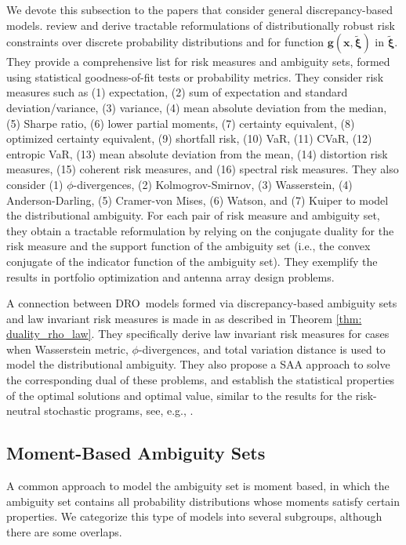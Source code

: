 \documentclass[final,onefignum,onetabnum]{class}
\newcommand{\bs}[1]{\boldsymbol{#1}} %
\newcommand{\txi}{\tilde{\bs{\xi}}}
\newcommand{\dro}{DRO}
\begin{document}
We devote  this subsection to the papers that consider general discrepancy-based models. 
\citet{postek2016} review and derive tractable reformulations of distributionally robust risk constraints over  discrete probability
distributions and for function $\bs{g}(\bs{x},\txi)$ in $\txi$. They provide a comprehensive list  for  risk measures and ambiguity sets, formed  using statistical
goodness-of-fit tests or probability metrics. 
They consider risk measures such as (1) expectation, (2) sum of expectation and standard deviation/variance, (3) variance, (4) mean absolute deviation from the median, (5) Sharpe ratio, (6) lower partial moments, (7) certainty equivalent, (8) optimized certainty equivalent, (9) shortfall risk, (10) VaR, (11) CVaR, (12) entropic VaR, (13) mean absolute deviation from the mean, (14) distortion risk measures, (15) coherent risk measures, and (16) spectral risk measures.  They also consider (1) $\phi$-divergences, (2) Kolmogrov-Smirnov, (3) Wasserstein, (4) Anderson-Darling, (5) Cramer-von Mises, (6) Watson, and (7) Kuiper to model the distributional ambiguity. For each pair of risk measure and ambiguity set, they obtain a tractable reformulation by relying on the conjugate duality for the risk measure and the support function of the ambiguity set (i.e., the convex conjugate of the
indicator function of the ambiguity set). They exemplify the results in portfolio optimization and antenna array design problems. 

A connection between \dro\ models formed via  discrepancy-based ambiguity sets and law invariant risk measures is made in \citet{shapiro2017DRSP} as described in Theorem \ref{thm: duality_rho_law}. They specifically derive law invariant risk measures  for cases when Wasserstein metric, $\phi$-divergences, and total variation distance is  used to model the distributional ambiguity. They also propose a SAA approach to solve the corresponding dual of these problems, and establish the statistical properties of the optimal solutions and optimal value, similar to the results for the risk-neutral stochastic programs, see, e.g.,  \citet{shapiro2014SP,shapiro2003montecarlo}. 

\subsection{Moment-Based Ambiguity Sets}
\label{sec: rev.moment}

A common approach to model the ambiguity set is moment based, in which the ambiguity set contains all probability distributions whose moments satisfy certain properties. We categorize this type of models into several subgroups, although there are some overlaps. %
\end{document}
